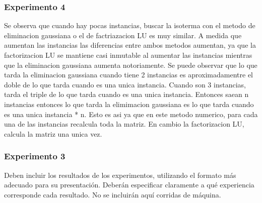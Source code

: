 	\subsubsection*{Experimento 4}
	Se observa que cuando hay pocas instancias, buscar la isoterma con el metodo de eliminacion gaussiana o el de factriazacion LU es muy similar. A medida que aumentan las instancias las diferencias entre ambos metodos aumentan, ya que la factorizacion LU se mantiene casi inmutable al aumentar las instancias mientras que la eliminacion gaussiana aumenta notoriamente. Se puede observar que lo que tarda la eliminacion gaussiana cuando tiene 2 instancias es aproximadamentre el doble de lo que tarda cuando es una unica instancia. Cuando son 3 instancias, tarda el triple de lo que tarda cuando es una unica instancia. Entonces saean n instancias entonces lo que tarda la elimimacion gaussiana es lo que tarda cuando es una unica instancia * n. Esto es asi ya que en este metodo numerico, para cada una de las instancias recalcula toda la matriz. En cambio la factorizacion LU, calcula la matriz una unica vez.
  	
	\subsubsection*{Experimento 3}
	


  {\color{Gray} Deben incluir los resultados de los experimentos, utilizando el formato más adecuado para su presentación. Deberán especificar claramente a qué experiencia corresponde cada resultado. No se incluirán aquí corridas de máquina.}

